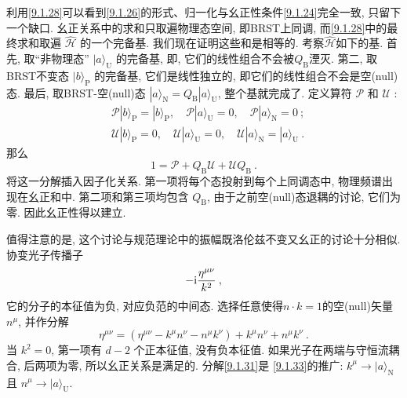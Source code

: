 利用\eqref{9.1.28}可以看到\eqref{9.1.26}的形式、归一化与幺正性条件\eqref{9.1.24}完全一致, 只留下一个缺口. 
幺正关系中的求和只取遍物理态空间, 即BRST上同调, 而\eqref{9.1.28}中的最终求和取遍 $\hat{\mathscr{H}} $ 的一个完备基. 
我们现在证明这些和是相等的. 考察$\hat{\mathscr{H}}$如下的基. 
首先, 取``非物理态'' $|a\rangle_{\mathrm{U}} $ 的完备基, 即, 它们的线性组合不会被$Q_{\mathrm{B}}$湮灭.
第二, 取BRST不变态 $|b\rangle_{\mathrm{P}}$ 的完备基, 它们是线性独立的, 即它们的线性组合不会是空(null)态.
最后, 取BRST-空(null)态 $|a\rangle_{\mathrm{N}}=Q_{\mathrm{B}}|a\rangle_{\mathrm{U}}$, 整个基就完成了. 
定义算符 $\mathscr{P}$ 和 $\mathscr{U}$ :
\begin{subequations} \label{9.1.30}
\begin{align}
	&\mathscr{P}|b\rangle_{\mathrm{P}} = |b\rangle_{\mathrm{P}}, \quad \mathscr{P}|a\rangle_{\mathrm{U}}=0, \quad 
	 \mathscr{P}|a\rangle_{\mathrm{N}} = 0 \:; \label{9.1.30a} \\
	&\mathscr{U}|b\rangle_{\mathrm{P}} = 0, \quad \mathscr{U}|a\rangle_{\mathrm{U}}=0, \quad 
	 \mathscr{U}|a\rangle_{\mathrm{N}} = |a\rangle_{\mathrm{U}} \:. \label{9.1.30b}
\end{align}
\end{subequations}
那么
\begin{equation}
	1=\mathscr{P}+Q_{\mathrm{B}} \mathscr{U}+\mathscr{U} Q_{\mathrm{B}} \:. \label{9.1.31}
\end{equation}
将这一分解插入因子化关系. 第一项将每个态投射到每个上同调态中, 物理频谱出现在幺正和中. 
第二项和第三项均包含 $Q_{\mathrm{B}}$, 由于之前空(null)态退耦的讨论, 它们为零. 因此幺正性得以建立.

值得注意的是, 这个讨论与规范理论中的振幅既洛伦兹不变又幺正的讨论十分相似. 协变光子传播子
\begin{equation}
	-\mathrm{i} \frac{\eta^{\mu \nu}}{k^{2}} \:, \label{9.1.32}
\end{equation}
它的分子的本征值为负, 对应负范的中间态. 选择任意使得$n \cdot k=1$的空(null)矢量$n^{\mu}$, 并作分解
\begin{equation}
	\eta^{\mu \nu}=(\eta^{\mu \nu}-k^{\mu} n^{\nu}-n^{\mu} k^{\nu}) + k^{\mu} n^{\nu}+n^{\mu} k^{\nu} \:. \label{9.1.33}
\end{equation}
当 $k^{2}=0$, 第一项有 $d-2$ 个正本征值, 没有负本征值. 如果光子在两端与守恒流耦合, 后两项为零, 所以幺正关系是满足的. 
分解\eqref{9.1.31}是 \eqref{9.1.33}的推广: $k^{\mu} \rightarrow|a\rangle_{\mathrm{N}}$ 且 $n^{\mu} \rightarrow|a\rangle_{\mathrm{U}}$.

